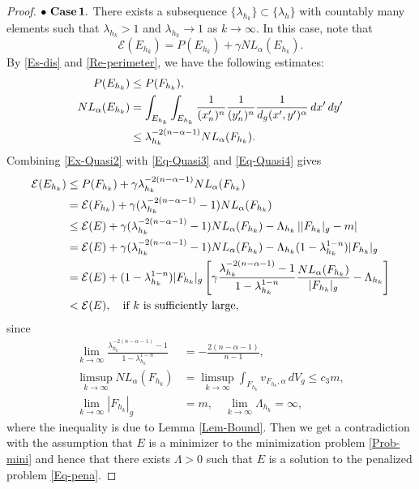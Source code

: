 \documentclass[11pt,reqno]{amsart}
\theoremstyle{definition}
\theoremstyle{remark}
\numberwithin{equation}{section}
\renewcommand{\(}{\left(}
\renewcommand{\)}{\right)}
\renewcommand{\-}{\overline}
\begin{document}
\begin{proof}
	\noindent$\bullet\,\,\bf{Case\,1}.$ There exists a subsequence $\{\lambda_{h_k}\}\subset \{\lambda_h\}$ with countably many elements such that $\lambda_{h_k}>1$ and $\lambda_{h_k}\to 1$ as $k\to\infty$. In this case, note that 
	\begin{equation}\label{Ex-Quasi2}
		\mathcal{E}(E_{h_k})=P(E_{h_k})+\gamma NL_{\alpha}(E_{h_k}).
	\end{equation}
	By \eqref{Es-dis} and \eqref{Re-perimeter}, we have the following estimates:
	\begin{align}
		P(E_{h_k})&\leq P(F_{h_k}),\label{Eq-Quasi3}\\
		NL_{\alpha}(E_{{h_k}})&=\int_{E_{h_k}}\int_{E_{h_k}}{\frac{1}{(x_n')^n}\frac{1}{(y_n')^n}\frac{1}{d_g(x',y')^{\alpha}}\,dx'\,dy'}\notag\\
		&\leq \lambda_{h_k}^{-2(n-\alpha-1)}NL_{\alpha}(F_{h_k}).\label{Eq-Quasi4}
	\end{align}
	Combining \eqref{Ex-Quasi2} with \eqref{Eq-Quasi3} and \eqref{Eq-Quasi4} gives
	\begin{align}
		\mathcal{E}(E_{h_k})&\leq P(F_{h_k})+\gamma \lambda_{h_k}^{-2(n-\alpha-1)}NL_{\alpha}(F_{h_k})\notag\\
		&=\mathcal{E}(F_{h_k})+\gamma(\lambda_{h_k}^{-2(n-\alpha-1)}-1)NL_{\alpha}(F_{h_k})\notag\\
		&\leq \mathcal{E}(E)+\gamma(\lambda_{h_k}^{-2(n-\alpha-1)}-1)NL_{\alpha}(F_{h_k})-\Lambda_{h_k}\left||F_{h_k}|_g-m\right|\notag\\
		&=\mathcal{E}(E)+\gamma(\lambda_{h_k}^{-2(n-\alpha-1)}-1)NL_{\alpha}(F_{h_k})-\Lambda_{h_k}(1-\lambda_{h_k}^{1-n})|F_{h_k}|_g\notag\\
		&=\mathcal{E}(E)+(1-\lambda_{h_k}^{1-n})|F_{h_k}|_g\left[\gamma\frac{\lambda_{h_k}^{-2(n-\alpha-1)}-1}{1-\lambda_{h_k}^{1-n}}\frac{NL_{\alpha}(F_{h_k})}{|F_{h_k}|_g}-\Lambda_{h_k}\right]\notag\\
		&<\mathcal{E}(E), \quad\text{if $k$ is sufficiently large},
	\end{align}
	since 
	\begin{align*}
		\lim_{k\to\infty}{\frac{\lambda_{h_k}^{-2(n-\alpha-1)}-1}{1-\lambda_{h_k}^{1-n}}}&=-\frac{2(n-\alpha-1)}{n-1},\\
		\limsup_{k\to\infty}NL_{\alpha}(F_{h_k})&=\limsup_{k\to\infty}\int_{F_{h_k}}{v_{F_{h_k},\alpha}}\,dV_g\leq c_3 m,\\
		\lim_{k\to\infty} |F_{h_k}|_g&=m, \quad \lim_{k\to\infty} \Lambda_{h_k}=\infty,
	\end{align*}
	where the inequality is due to Lemma \ref{Lem-Bound}. Then we get a contradiction with the assumption that $E$ is a minimizer to the minimization problem \eqref{Prob-mini} and  hence that there exists $\Lambda>0$ such that $E$ is a solution to the penalized problem \eqref{Eq-pena}.
	

\end{proof}
\end{document}
